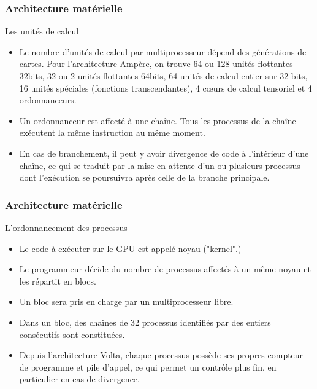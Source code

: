 \begin{frame}
    \frametitle{Architecture matérielle}
\begin{block}{Les unités de calcul}
   \begin{itemize}
    \item<+-> Le nombre d'unités de calcul par multiprocesseur dépend des générations de cartes. Pour l'architecture 
    Ampère, on trouve 64 ou 128 unités flottantes 32bits, 32 ou 2 unités flottantes 64bits, 64 unités de calcul entier
    sur 32 bits, 16 unités spéciales (fonctions transcendantes), 4 cœurs de calcul tensoriel et 4 ordonnanceurs.
    \item<+-> Un ordonnanceur est affecté à une chaîne. Tous les processus de la chaîne exécutent la même instruction
    au même moment.
    \item<+-> En cas de branchement, il peut y avoir divergence de code à l'intérieur d'une chaîne, ce qui se traduit par la 
    mise en attente d'un ou plusieurs processus dont l'exécution se poursuivra après celle de la branche principale. 
   \end{itemize} 
\end{block}
\end{frame}
\begin{frame}
    \frametitle{Architecture matérielle}
\begin{block}{L'ordonnancement des processus}
   \begin{itemize}
    \item<+-> Le code à exécuter sur le GPU est appelé noyau ("kernel".)
    \item<+-> Le programmeur décide du nombre de processus affectés à un même noyau et les répartit en blocs.
    \item<+-> Un bloc sera pris en charge par un multiprocesseur libre.
    \item<+-> Dans un bloc, des chaînes de 32 processus identifiés par des entiers consécutifs sont constituées. 
    \item<+-> Depuis l'architecture Volta, chaque processus possède ses propres compteur de programme et pile d'appel,
    ce qui permet un contrôle plus fin, en particulier en cas de divergence.
   \end{itemize} 
\end{block}
\end{frame}
